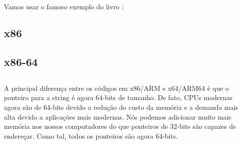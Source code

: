 \section{\HelloWorldSectionName}
\label{sec:helloworld}

Vamos usar o famoso exemplo do livro \KRBook:



\subsection{x86}




\subsection{x86-64}







\subsection{\Conclusion{}}

A principal diferença entre os códigos em x86/ARM e x64/ARM64 é que o ponteiro para a string é agora 64-bits de tamanho.
De fato, \ac{CPU}s modernas agora são de 64-bits devido a redução do custo da memória e a demanda mais alta devido a aplicações mais modernas.
Nós podemos adicionar muito mais memória nos nossos computadores do que ponteiros de 32-bits são capazes de endereçar.
Como tal, todos os ponteiros são agora 64-bits.




